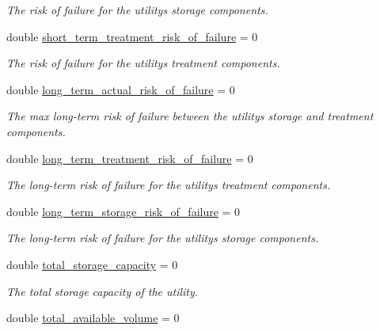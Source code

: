 \begin{DoxyCompactItemize}
\begin{DoxyCompactList}\small\item\em The risk of failure for the utility\textquotesingle{}s storage components. \end{DoxyCompactList}\item 
double \mbox{\hyperlink{classUtility_abf33b819a112cb4b7a29082b5c68ef2b}{short\+\_\+term\+\_\+treatment\+\_\+risk\+\_\+of\+\_\+failure}} = 0
\begin{DoxyCompactList}\small\item\em The risk of failure for the utility\textquotesingle{}s treatment components. \end{DoxyCompactList}\item 
double \mbox{\hyperlink{classUtility_ab7b07d7ebc509ce9fb1ec34c0b756aad}{long\+\_\+term\+\_\+actual\+\_\+risk\+\_\+of\+\_\+failure}} = 0
\begin{DoxyCompactList}\small\item\em The max long-\/term risk of failure between the utility\textquotesingle{}s storage and treatment components. \end{DoxyCompactList}\item 
double \mbox{\hyperlink{classUtility_a326996f6fae2a0f897e3816e374853f5}{long\+\_\+term\+\_\+treatment\+\_\+risk\+\_\+of\+\_\+failure}} = 0
\begin{DoxyCompactList}\small\item\em The long-\/term risk of failure for the utility\textquotesingle{}s treatment components. \end{DoxyCompactList}\item 
double \mbox{\hyperlink{classUtility_a6943bf861df9229f3cbeaa2e6ca8ac55}{long\+\_\+term\+\_\+storage\+\_\+risk\+\_\+of\+\_\+failure}} = 0
\begin{DoxyCompactList}\small\item\em The long-\/term risk of failure for the utility\textquotesingle{}s storage components. \end{DoxyCompactList}\item 
double \mbox{\hyperlink{classUtility_a514f6caff5dc9c36588d376a71b933b7}{total\+\_\+storage\+\_\+capacity}} = 0
\begin{DoxyCompactList}\small\item\em The total storage capacity of the utility. \end{DoxyCompactList}\item 
double \mbox{\hyperlink{classUtility_a2a6a6a6240acf6e79a210dac604a5c0b}{total\+\_\+available\+\_\+volume}} = 0

\end{DoxyCompactItemize}
